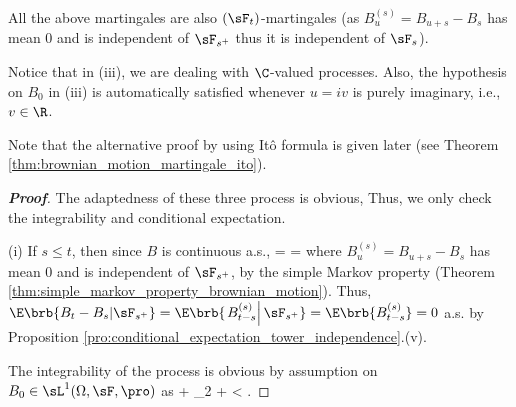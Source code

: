 \begin{remark}
All the above martingales are also $(\sF_t)$-martingales (as $B^{(s)}_u = B_{u+s} -B_s$ has mean 0 and is independent of $\sF_{s^+}$ thus it is independent of $\sF_s$). %

Notice that in (iii), we are dealing with $\C$-valued processes. Also, the hypothesis on $B_0$ in (iii) is automatically satisfied whenever $u = iv$ is purely imaginary, i.e., $v \in \R$.

Note that the alternative proof by using It\^o formula is given later (see Theorem \ref{thm:brownian_motion_martingale_ito}).%
\end{remark}

\begin{proof}[\bf Proof]
The adaptedness of these three process is obvious, Thus, we only check the integrability and conditional expectation.
\ben
\item [(i)] If $s \leq t$, then since $B$ is continuous a.s.,
\be
\E{} = \E{} = \E{}
\ee
where $B^{(s)}_u = B_{u+s} -B_s$ has mean 0 and is independent of $\sF_{s^+}$, by the simple Markov property (Theorem \ref{thm:simple_markov_property_brownian_motion}). Thus, $\E\brb{B_t -B_s|\sF_{s^+}} = \E\brb{\left.B^{(s)}_{t-s}\right|\sF_{s^+}} = \E\brb{B^{(s)}_{t-s}} = 0$ a.s. by Proposition \ref{pro:conditional_expectation_tower_independence}.(v).

The integrability of the process is obvious by assumption on $B_0 \in \sL^1(\Omega,\sF,\pro)$ as
\be
\E{} \leq \E{} + \E{} \leq {}_2 + \E{} < \infty.
\ee


\end{proof}
